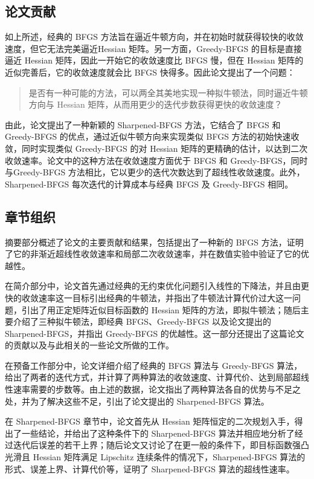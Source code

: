 \documentclass[a4paper,twoside,AutoFakeBold]{article}
\theoremstyle{definition}
\begin{document}
\subsection{论文贡献}
如上所述，经典的 BFGS 方法旨在逼近牛顿方向，并在初始时就获得较快的收敛速度，但它无法完美逼近Hessian 矩阵。另一方面，Greedy-BFGS 的目标是直接逼近 Hessian 矩阵，因此一开始它的收敛速度比 BFGS 慢，但在 Hessian 矩阵的近似完善后，它的收敛速度就会比 BFGS 快得多。因此论文提出了一个问题：

\begin{quote}
    是否有一种可能的方法，可以两全其美地实现一种拟牛顿法，同时逼近牛顿方向与 Hessian 矩阵，从而用更少的迭代步数获得更快的收敛速度？    
\end{quote}


由此，论文提出了一种新颖的 Sharpened-BFGS 方法，它结合了 BFGS 和 Greedy-BFGS 的优点，通过近似牛顿方向来实现类似 BFGS 方法的初始快速收敛，同时实现类似 Greedy-BFGS 的对 Hessian 矩阵的更精确的估计，以达到二次收敛速率。论文中的这种方法在收敛速度方面优于 BFGS 和 Greedy-BFGS，同时与Greedy-BFGS 方法相比，它以更少的迭代次数达到了超线性收敛速度。此外，Sharpened-BFGS 每次迭代的计算成本与经典 BFGS 及 Greedy-BFGS 相同。
\subsection{章节组织}
摘要部分概述了论文的主要贡献和结果，包括提出了一种新的 BFGS 方法，证明了它的非渐近超线性收敛速率和局部二次收敛速率，并在数值实验中验证了它的优越性。

在简介部分中，论文首先通过经典的无约束优化问题引入线性的下降法，并且由更快的收敛速率这一目标引出经典的牛顿法，并指出了牛顿法计算代价过大这一问题，引出了用正定矩阵近似目标函数的 Hessian 矩阵的方法，即拟牛顿法；随后主要介绍了三种拟牛顿法，即经典 BFGS、Greedy-BFGS 以及论文提出的 Sharpened-BFGS，并指出 Greedy-BFGS 的优越性。这一部分还提出了这篇论文的贡献以及与此相关的一些论文所做的工作。

在预备工作部分中，论文详细介绍了经典的 BFGS 算法与 Greedy-BFGS 算法，给出了两者的迭代方式，并计算了两种算法的收敛速度、计算代价、达到局部超线性速率需要的步数等。由上述的数据，论文指出了两种算法各自的优势与不足之处，并为了解决这些不足，引出了论文提出的 Sharpened-BFGS 算法。

在 Sharpened-BFGS 章节中，论文首先从 Hessian 矩阵恒定的二次规划入手，得出了一些结论，并给出了这种条件下的 Sharpened-BFGS 算法并相应地分析了经过迭代后误差的若干上界；随后论文又讨论了在更一般的条件下，即目标函数强凸光滑且 Hessian 矩阵满足 Lipschitz 连续条件的情况下，Sharpened-BFGS 算法的形式、误差上界、计算代价等，证明了 Sharpened-BFGS 算法的超线性速率。
\end{document}

